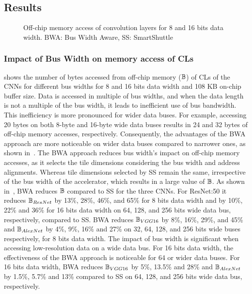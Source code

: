 \subsection{Results}
\begin{figure}[!htb]
	\centering
	\hfil	
	\hfil			
	\hfil	
	\caption{Off-chip memory access of convolution layers for 8 and 16 bits data width. BWA: Bus Width Aware, SS: SmartShuttle}
	\label{fig:AccessenOn64BitDataBus}
	\vspace{-1.0em}
\end{figure}
\subsubsection{Impact of Bus Width on memory access of CLs}
 shows the number of bytes accessed from off-chip memory ($\mathbb{B}$) of CLs of the CNNs for different bus widths for 8 and 16 bits data width and 108 KB on-chip buffer size. Data is accessed in multiple of bus widths, and when the data length is not a multiple of the bus width, it leads to inefficient use of bus bandwidth. This inefficiency is more pronounced for wider data buses. For example, accessing 20 bytes on both 8-byte and 16-byte wide data buses results in 24 and 32 bytes of off-chip memory accesses, respectively. Consequently, the advantages of the BWA approach are more noticeable on wider data buses compared to narrower ones, as shown in~. The BWA approach reduces bus width's impact on off-chip memory accesses, as it selects the tile dimensions considering the bus width and address alignments. Whereas tile dimensions selected by SS remain the same, irrespective of the bus width of the accelerator, which results in a large value of $\mathbb{B}$.
As shown in~, BWA reduces $\mathbb{B}$ compared to SS for the three CNNs. For ResNet:50 it reduces $\mathbb{B}_{ResNet}$ by 13\%, 28\%, 46\%, and 65\% for 8 bits data width and by 10\%, 22\% and 36\% for 16 bits data width on 64, 128, and 256 bits wide data bus, respectively, compared to SS. 
BWA reduces $\mathbb{B}_{VGG16}$ by 8\%, 16\%, 29\%, and 45\% and $\mathbb{B}_{AlexNet}$ by 4\%, 9\%, 16\% and 27\% on 32, 64, 128, and 256 bits wide buses respectively, for 8 bits data width. 
The impact of bus width is significant when accessing low-resolution data on a wide data bus. For 16 bits data width, the effectiveness of the BWA approach is noticeable for 64 or wider data buses. For 16 bits data width, BWA reduces $\mathbb{B}_{VGG16}$ by 5\%, 13.5\% and 28\% and $\mathbb{B}_{AlexNet}$ by 1.5\%, 5.7\% and 13\% compared to SS on 64, 128, and 256 bits wide data bus, respectively.
